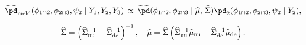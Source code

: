 \begin{equation}
\begin{gathered}
  \widehat{\pd}_{\text{meld}} (\phi_{1 \cap 2}, \phi_{2 \cap 3}, \psi_{2} \mid Y_{1}, Y_{2}, Y_{3})
  \, \propto \,
  \widehat{\pd}(\phi_{1 \cap 2}, \phi_{2 \cap 3} \mid \widehat{\mu}, \, \widehat{\Sigma})
  \pd_{2}(\phi_{1 \cap 2}, \phi_{2 \cap 3}, \psi_{2} \mid Y_{2}), \\[1.5ex]
    \widehat{\Sigma} = \left(
      \widehat{\Sigma}_{\text{nu}}^{-1} - \widehat{\Sigma}_{\text{de}}^{-1}
    \right)^{-1}, \quad
    \widehat{\mu} = \widehat{\Sigma} \left(
      \widehat{\Sigma}_{\text{nu}}^{-1}\widehat{\mu}_{\text{nu}} - \widehat{\Sigma}_{\text{de}}^{-1}\widehat{\mu}_{\text{de}}
    \right).
\end{gathered}
\label{eqn:final-normal-approx-appendix}
\end{equation}
